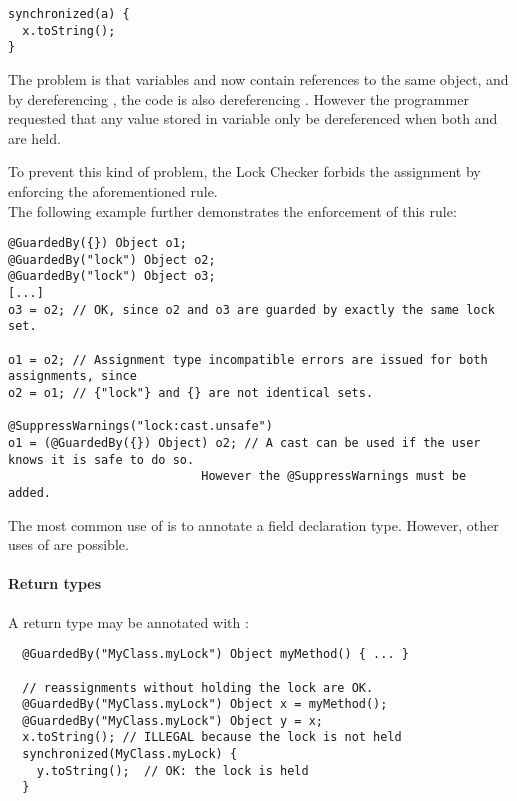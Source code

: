 \begin{Verbatim}
synchronized(a) {
  x.toString();
}
\end{Verbatim}

The problem is that variables  and  now contain references to
the same object, and by dereferencing , the code is also dereferencing
.  However the programmer requested that any value stored in variable
 only be dereferenced when both  and  are held.

To prevent this kind of problem, the Lock Checker forbids the assignment
 by enforcing the aforementioned rule.
\\

The following example further demonstrates the enforcement of this rule:

\begin{Verbatim}
@GuardedBy({}) Object o1;
@GuardedBy("lock") Object o2;
@GuardedBy("lock") Object o3;
[...]
o3 = o2; // OK, since o2 and o3 are guarded by exactly the same lock set.

o1 = o2; // Assignment type incompatible errors are issued for both assignments, since
o2 = o1; // {"lock"} and {} are not identical sets.

@SuppressWarnings("lock:cast.unsafe")
o1 = (@GuardedBy({}) Object) o2; // A cast can be used if the user knows it is safe to do so.
                           However the @SuppressWarnings must be added.
\end{Verbatim}





The most common use of  is to annotate a field declaration
type.  However, other uses of  are possible.

\paragraph{Return types\label{lock-examples-guardedby-return}}

A return type may be annotated with :

\begin{Verbatim}
  @GuardedBy("MyClass.myLock") Object myMethod() { ... }

  // reassignments without holding the lock are OK.
  @GuardedBy("MyClass.myLock") Object x = myMethod();
  @GuardedBy("MyClass.myLock") Object y = x;
  x.toString(); // ILLEGAL because the lock is not held
  synchronized(MyClass.myLock) {
    y.toString();  // OK: the lock is held
  }
\end{Verbatim}

